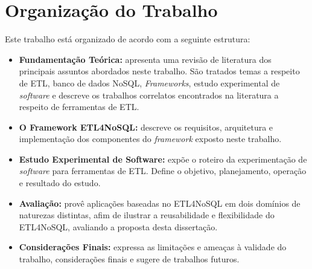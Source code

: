 \section{Organização do Trabalho}

Este trabalho está organizado de acordo com a seguinte estrutura:

\begin{itemize}
	\item \textbf{Fundamentação Teórica:} apresenta uma revisão de literatura dos principais assuntos abordados neste trabalho. São tratados temas a respeito de ETL, banco de dados NoSQL, \textit{Frameworks}, estudo experimental de \textit{software} e descreve os trabalhos correlatos encontrados na literatura a respeito de ferramentas de ETL.
	
	\item \textbf{O Framework ETL4NoSQL:} descreve os requisitos, arquitetura e implementação dos componentes do \textit{framework} exposto neste trabalho.
			
	\item \textbf{Estudo Experimental de Software:} expõe o roteiro da experimentação de \textit{software} para ferramentas de ETL. Define o objetivo, planejamento, operação e resultado do estudo.
	
	\item \textbf{Avaliação:} provê aplicações baseadas no ETL4NoSQL em dois domínios de naturezas distintas, afim de ilustrar a reusabilidade e flexibilidade do ETL4NoSQL, avaliando a proposta desta dissertação.
		
	\item \textbf{Considerações Finais:} expressa as limitações e ameaças à validade do trabalho, considerações finais e sugere de trabalhos futuros.	
	
\end{itemize}

